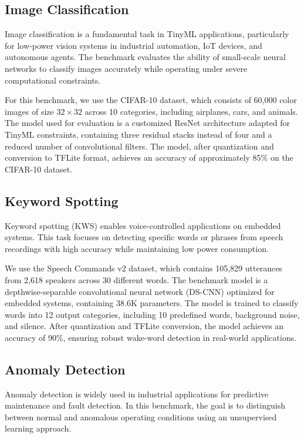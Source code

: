 \documentclass[conference]{IEEEtran}
\begin{document}
\subsection{Image Classification}

Image classification is a fundamental task in TinyML applications, particularly for low-power vision systems in industrial automation, IoT devices, and autonomous agents. The benchmark evaluates the ability of small-scale neural networks to classify images accurately while operating under severe computational constraints.

For this benchmark, we use the CIFAR-10 dataset, which consists of 60,000 color images of size $32\times32$ across 10 categories, including airplanes, cars, and animals. The model used for evaluation is a customized ResNet architecture adapted for TinyML constraints, containing three residual stacks instead of four and a reduced number of convolutional filters. The model, after quantization and conversion to TFLite format, achieves an accuracy of approximately 85\% on the CIFAR-10 dataset.

\subsection{Keyword Spotting}

Keyword spotting (KWS) enables voice-controlled applications on embedded systems. This task focuses on detecting specific words or phrases from speech recordings with high accuracy while maintaining low power consumption.

We use the Speech Commands v2 dataset, which contains 105,829 utterances from 2,618 speakers across 30 different words. The benchmark model is a depthwise-separable convolutional neural network (DS-CNN) optimized for embedded systems, containing 38.6K parameters. The model is trained to classify words into 12 output categories, including 10 predefined words, background noise, and silence. After quantization and TFLite conversion, the model achieves an accuracy of 90\%, ensuring robust wake-word detection in real-world applications.

\subsection{Anomaly Detection}

Anomaly detection is widely used in industrial applications for predictive maintenance and fault detection. In this benchmark, the goal is to distinguish between normal and anomalous operating conditions using an unsupervised learning approach.
\end{document}
